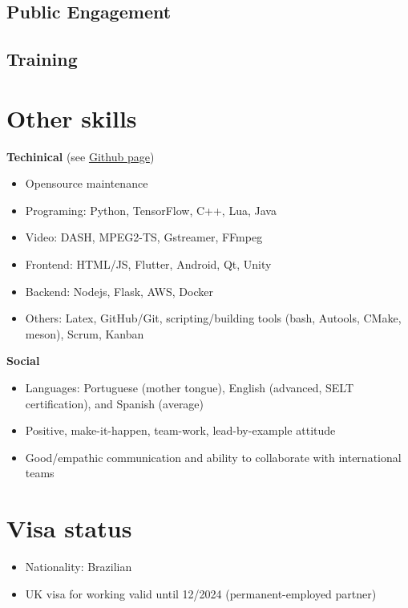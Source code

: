 \documentclass[10pt,a4paper,sans,colorlinks]{moderncv}
\begin{document}
  \subsection{Public Engagement}

  \subsection{Training}

\section{Other skills}

\textbf{Techinical} (see \href{https://github.com/alanlivio}{Github page})
  \begin{itemize}[mynosep]
    \item Opensource maintenance
    \item Programing: Python, TensorFlow, C++, Lua, Java
    \item Video: DASH, MPEG2-TS, Gstreamer, FFmpeg
    \item Frontend: HTML/JS, Flutter, Android, Qt, Unity
    \item Backend: Nodejs, Flask, AWS, Docker
    \item Others: Latex, GitHub/Git, scripting/building tools (bash, Autools, CMake, meson), Scrum, Kanban
  \end{itemize}

\textbf{Social}
  \begin{itemize}[mynosep]
    \item Languages: Portuguese (mother tongue), English (advanced, SELT certification), and Spanish (average)
    \item Positive, make-it-happen, team-work, lead-by-example attitude
    \item Good/empathic communication and ability to collaborate with international teams
  \end{itemize}

\section{Visa status}
  \begin{itemize}[mynosep]
    \item Nationality: Brazilian
    \item UK visa for working valid until 12/2024 (permanent-employed partner)
  \end{itemize}
\end{document}
